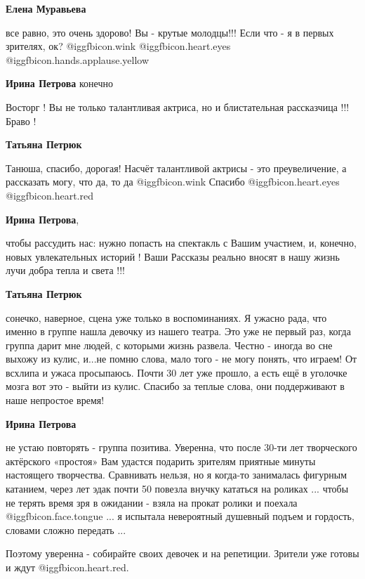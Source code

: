\begin{itemize}
\begin{itemize}
\textbf{Елена Муравьева} 

все равно, это очень здорово! Вы - крутые молодцы!!! Если что - я в первых
зрителях, ок? @igg{fbicon.wink}  @igg{fbicon.heart.eyes}
@igg{fbicon.hands.applause.yellow} 

\textbf{Ирина Петрова} конечно
\end{itemize} %


Восторг ! Вы не только талантливая актриса, но и блистательная рассказчица !!!
Браво !

\begin{itemize} %
\textbf{Татьяна Петрюк} 

Танюша, спасибо, дорогая! Насчёт талантливой актрисы - это преувеличение, а
рассказать могу, что да, то да @igg{fbicon.wink}  Спасибо
@igg{fbicon.heart.eyes} @igg{fbicon.heart.red}

\begin{itemize} %
\textbf{Ирина Петрова}, 

чтобы рассудить нас: нужно попасть на спектакль с Вашим участием, и,
конечно, новых увлекательных историй ! Ваши Рассказы реально вносят в нашу
жизнь лучи добра тепла и света !!!

\textbf{Татьяна Петрюк} 

сонечко, наверное, сцена уже только в воспоминаниях. Я ужасно рада, что именно
в группе нашла девочку из нашего театра. Это уже не первый раз, когда группа
дарит мне людей, с которыми жизнь развела. Честно - иногда во сне выхожу из
кулис, и...не помню слова, мало того - не могу понять, что играем! От всхлипа и
ужаса просыпаюсь. Почти 30 лет уже прошло, а есть ещё в уголочке мозга вот это
- выйти из кулис. Спасибо за теплые слова, они поддерживают в наше непростое
время!

\textbf{Ирина Петрова} 

не устаю повторять - группа позитива. Уверенна, что после 30-ти лет творческого
актёрского «простоя» Вам удастся подарить зрителям приятные минуты настоящего
творчества. Сравнивать нельзя, но я когда-то занималась фигурным катанием,
через лет эдак почти 50 повезла внучку кататься на роликах ... чтобы не терять
время зря в ожидании - взяла на прокат ролики и поехала  @igg{fbicon.face.tongue} ... я испытала
невероятный душевный подъем и гордость, словами сложно передать ...

Поэтому уверенна - собирайте своих девочек и на репетиции. Зрители уже готовы и
ждут @igg{fbicon.heart.red}.
\end{itemize} %


\end{itemize}
\end{itemize}
